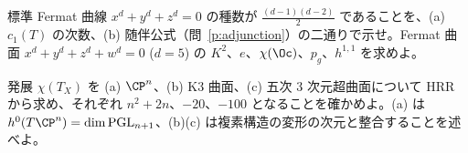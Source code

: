 \begin{prob}{標準}\label{p:Fermat}
Fermat 曲線 $x^d+y^d+z^d=0$ の種数が $\frac{(d-1)(d-2)}2$ であることを、(a) $c_1(T)$ の次数、(b) 随伴公式（問~\ref{p:adjunction}）の二通りで示せ。Fermat 曲面 $x^d+y^d+z^d+w^d=0$ ($d=5$) の $K^2$、$e$、$\chi(\Oc)$、$p_g$、$h^{1,1}$ を求めよ。
\end{prob}
\begin{prob}{発展}\label{p:chiT}
$\chi(T_X)$ を (a) $\CP^n$、(b) K3 曲面、(c) 五次 3 次元超曲面について HRR から求め、それぞれ $n^2+2n$、$-20$、$-100$ となることを確かめよ。(a) は $h^0(T\CP^n)=\dim\mathrm{PGL}_{n+1}$、(b)(c) は複素構造の変形の次元と整合することを述べよ。
\end{prob}
